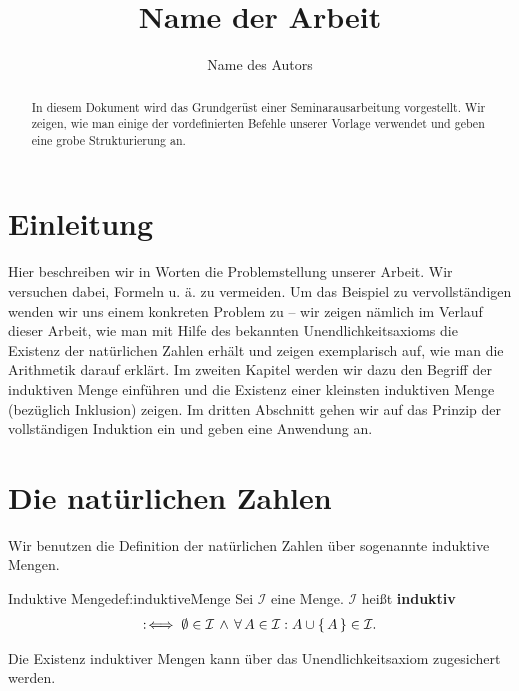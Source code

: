 \documentclass{article}
\author{Name des Autors}
\title{Name der Arbeit}
\begin{document}
\maketitle

\begin{abstract}
In diesem Dokument wird das Grundger\"ust einer
Seminarausarbeitung vorgestellt.
Wir zeigen, wie man einige der vordefinierten Befehle unserer Vorlage verwendet
und geben eine grobe Strukturierung an.
\end{abstract}

\section{Einleitung}

Hier beschreiben wir in Worten die Problemstellung unserer Arbeit. Wir
versuchen dabei, Formeln u. \"a. zu vermeiden. Um das Beispiel zu
vervollst\"andigen wenden wir uns einem konkreten Problem zu -- wir zeigen
n\"amlich im Verlauf dieser Arbeit, wie man mit Hilfe des bekannten
Unendlichkeitsaxioms die Existenz der nat\"urlichen Zahlen erh\"alt und zeigen
exemplarisch auf, wie man die Arithmetik darauf erkl\"art. Im zweiten Kapitel
werden wir dazu den Begriff der induktiven Menge einf\"uhren und die Existenz
einer kleinsten induktiven Menge (bez\"uglich Inklusion) zeigen. Im dritten
Abschnitt gehen wir auf das Prinzip der vollst\"andigen Induktion ein und geben
eine Anwendung an.

\section{Die nat\"urlichen Zahlen}

Wir benutzen die Definition der nat\"urlichen Zahlen \"uber sogenannte
induktive Mengen.

\begin{definition}{Induktive Menge}{def:induktiveMenge}
Sei $\mathcal{I}$ eine Menge. $\mathcal{I}$ hei\ss{}t \textbf{induktiv}
\begin{align*}
:\!\iff \emptyset \in \mathcal{I}
        \, \wedge \,
        \forall\, A \in \mathcal{I}: A \cup \set{A} \in \mathcal{I}\text.
\end{align*}
\end{definition}

Die Existenz induktiver Mengen kann \"uber das Unendlichkeitsaxiom zugesichert
werden.
\end{document}
